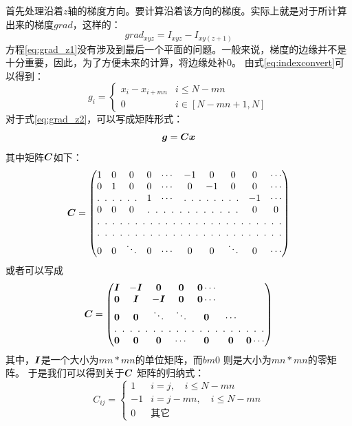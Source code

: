 首先处理沿着$z$轴的梯度方向。要计算沿着该方向的梯度。实际上就是对于所计算出来的梯度$grad$，这样的：
\begin{equation}\label{eq:grad_z1}
grad_{xyz} = I_{xyz}-I_{xy(z+1)}
\end{equation}
方程\eqref{eq:grad_z1}没有涉及到最后一个平面的问题。一般来说，梯度的边缘并不是十分重要，因此，为了方便未来的计算，将边缘处补$0$。
由式\eqref{eq:indexconvert}可以得到：
\begin{equation}\label{eq:grad_z2}
g_i = \begin{cases}
        x_{i} - x_{i+mn} & i \le N-mn \\
        0   & i \in [N-mn+1,N]
        \end{cases}
\end{equation}
对于式\eqref{eq:grad_z2}，可以写成矩阵形式：
\begin{equation*}
\bm{g} = \bm{C} \bm{ x}
\end{equation*}
其中矩阵$\bm{C}$如下：
\begin{equation*}
\C = \begin{pmatrix}
1 & 0 & 0 & 0 & \cdots &-1 & 0 &0 &0 &\cdots \\
0 & 1 & 0 & 0 &\cdots &0 & -1 &0 &0 &\cdots \\
\hdotsfor[3]{3}& 1& \cdots &\hdotsfor[3]{3}&-1&\cdots \\
0 & 0 & 0 & \hdotsfor[3]{5}&0&0 \\
\hdotsfor[3]{10}\\
\hdotsfor[3]{10}\\
0 & 0 & \ddots & 0 & \cdots & 0 & 0 & \ddots & 0& \cdots
\end{pmatrix}
\end{equation*}
或者可以写成
\begin{equation*}
\C = \begin{pmatrix}
\bI &  -\bI & \0 & \0 & \0 \cdots \\
\0 & \bI &  -\bI & \0 & \0 \cdots \\
\0 & \0  & \ddots & \ddots & \0 & \cdots \\
\hdotsfor[3]{7} \\
\0 & \0 & \0 &\cdots & \0 & \0 &\0 \cdots
\end{pmatrix}
\end{equation*}
其中，$\bm{I}$是一个大小为$mn * mn$的单位矩阵，而$bm 0$ 则是大小为$mn * mn$的零矩阵。
于是我们可以得到关于$\bm{C}$ 矩阵的归纳式：
\begin{equation}\label{eq:C}
C_{ij} = \begin{cases}
1 & i = j,\quad i\le N-mn \\
-1 & i = j- mn,\quad i\le N- mn \\
0 & \text{其它}
\end{cases}
\end{equation}

